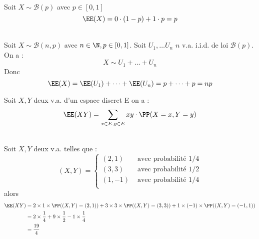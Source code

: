 \documentclass[12pt,fleqn]{report} %
\begin{document}
\begin{example}\text{ }\\
	Soit $X \sim \mathcal{B}(p)$ avec $p \in [0,1]$
	\[
	\EE(X) = 0 \cdot(1-p) + 1\cdot p = p
	\]
\end{example}

\pagebreak
\begin{example}\text{ }\\
	
	Soit $X \sim \mathcal{B}(n,p)$ avec $n \in \N, p\in [0,1]$.
	Soit $U_1,\dots U_n$  $n$ v.a. i.i.d. de loi $\mathcal{B}(p)$. On a :
	\[
	X \sim U_1 + \dots + U_n
	\]
	Donc \[
	\EE(X) = \EE(U_1) + \dots + \EE(U_n) = p + \dots + p = np
	\]
\end{example}




\begin{definition}
	Soit $X,Y$ deux v.a. d'un espace discret E on a :
	\[
	\EE(XY) = \sum\limits_{x\in E,y\in E} xy\cdot\PP(X = x,Y = y)
	\]
\end{definition}

\begin{example}\text{ }\\
	Soit $X,Y$ deux v.a. telles que : 
	\[
	(X,Y) = \left\lbrace\begin{array}{cl}
	(2,1) & \text{ avec probabilité 1/4} \\
	(3,3) & \text{ avec probabilité 1/2} \\
	(1,-1) & \text{ avec probabilité 1/4} \\
	\end{array}\right.
	\]
	alors \begin{align*}
	\EE(XY) & = 2\times 1\times \PP((X,Y) = (2,1)) + 3\times3 \times\PP((X,Y) = (3,3)) + 1\times (-1) \times\PP((X,Y) = (-1,1)) \\
	& = 2\times \frac{1}{4} + 9 \times\frac{1}{2} - 1\times \frac{1}{4} \\ 
	& = \frac{19}{4}
	\end{align*}
\end{example}
\end{document}
